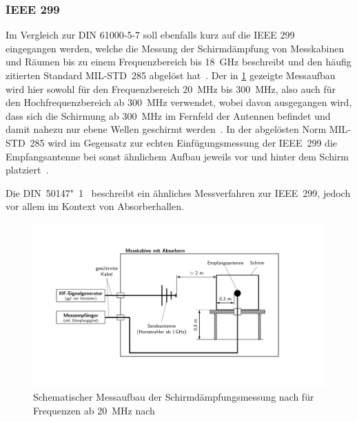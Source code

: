 \subsubsection{IEEE 299}
Im Vergleich zur DIN 61000-5-7 soll ebenfalls kurz auf die IEEE 299~\cite{IEEE_299} eingegangen werden, welche die Messung der Schirmdämpfung von Messkabinen und Räumen bis zu einem Frequenzbereich bis \SI{18}{\giga\hertz} beschreibt und den häufig zitierten Standard MIL-STD~285 abgelöst hat~\cite{EM_Schirmung}. Der in \Abb\ref{fig:2_Schematik-Schirmdaempfungsmessung_IEEE_299} gezeigte Messaufbau wird hier sowohl für den Frequenzbereich \SI{20}{\mega\hertz} bis \SI{300}{\mega\hertz}, also auch für den Hochfrequenzbereich ab \SI{300}{\mega\hertz} verwendet, wobei davon ausgegangen wird, dass sich die Schirmung ab \SI{300}{\mega\hertz} im Fernfeld der Antennen befindet und damit nahezu nur ebene Wellen geschirmt werden~\cite{EM_Schirmung, IEEE_299}. In der abgelösten Norm MIL-STD~285 wird im Gegensatz zur echten Einfügungsmessung der IEEE~299 die Empfangsantenne bei sonst ähnlichem Aufbau jeweils vor und hinter dem Schirm platziert~\cite{EM_Schirmung}.
\par
\vspace{\linespace}
Die DIN~50147"~1~\cite{DIN_EN_50147-1} beschreibt ein ähnliches Messverfahren zur IEEE~299, jedoch vor allem im Kontext von Absorberhallen.  

\begin{figure}[ht]
    \centering
    \includegraphics[page = 2, trim = 2cm 3cm 4cm 3cm, clip, width=.9\textwidth]{Abbildungen/Kapitel2/Schematiken_Schirmdaempfungsmessung.pdf}
    \caption[Schematischer Messaufbau der Schirmdämpfungsmessung nach \citeauthor{IEEE_299} für Frequenzen ab \SI{20}{\mega\hertz}]{Schematischer Messaufbau der Schirmdämpfungsmessung nach \citeauthor{IEEE_299} für Frequenzen ab \SI{20}{\mega\hertz} nach~\cite{IEEE_299}}
    \label{fig:2_Schematik-Schirmdaempfungsmessung_IEEE_299}
\end{figure}


